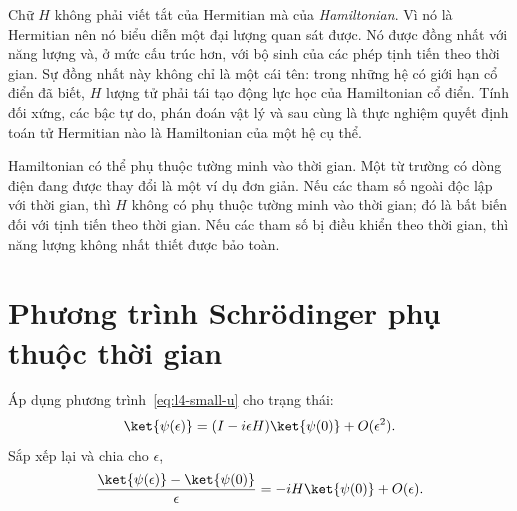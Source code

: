 Chữ \(H\) không phải viết tắt của Hermitian mà của \emph{Hamiltonian}. Vì nó là Hermitian nên nó biểu diễn một đại lượng quan sát được. Nó được đồng nhất với năng lượng và, ở mức cấu trúc hơn, với bộ sinh của các phép tịnh tiến theo thời gian. Sự đồng nhất này không chỉ là một cái tên: trong những hệ có giới hạn cổ điển đã biết, \(H\) lượng tử phải tái tạo động lực học của Hamiltonian cổ điển. Tính đối xứng, các bậc tự do, phán đoán vật lý và sau cùng là thực nghiệm quyết định toán tử Hermitian nào là Hamiltonian của một hệ cụ thể.

\begin{classroomqa}
\end{classroomqa}

Hamiltonian có thể phụ thuộc tường minh vào thời gian. Một từ trường có dòng điện đang được thay đổi là một ví dụ đơn giản. Nếu các tham số ngoài độc lập với thời gian, thì \(H\) không có phụ thuộc tường minh vào thời gian; đó là bất biến đối với tịnh tiến theo thời gian. Nếu các tham số bị điều khiển theo thời gian, thì năng lượng không nhất thiết được bảo toàn.

\begin{classroomqa}
\end{classroomqa}

\section{Phương trình Schr\"odinger phụ thuộc thời gian}

Áp dụng phương trình~\eqref{eq:l4-small-u} cho trạng thái:
\begin{equation}
\ket{\psi(\epsilon)}=(I-i\epsilon H)\ket{\psi(0)}+O(\epsilon^2).
\end{equation}
Sắp xếp lại và chia cho \(\epsilon\),
\begin{equation}
\frac{\ket{\psi(\epsilon)}-\ket{\psi(0)}}{\epsilon}
=-iH\ket{\psi(0)}+O(\epsilon).
\label{eq:l4-difference-quotient}
\end{equation}

